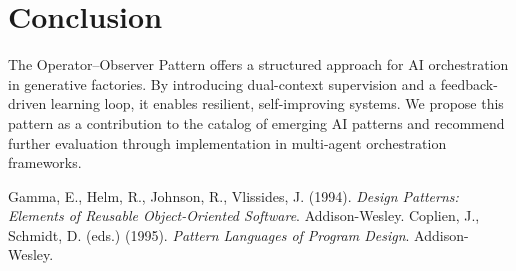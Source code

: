 \documentclass[11pt,a4paper]{article}
\begin{document}
\section{Conclusion}
The Operator--Observer Pattern offers a structured approach for AI orchestration in generative factories. By introducing dual-context supervision and a feedback-driven learning loop, it enables resilient, self-improving systems. We propose this pattern as a contribution to the catalog of emerging AI patterns and recommend further evaluation through implementation in multi-agent orchestration frameworks.


\begin{thebibliography}{9}
 Gamma, E., Helm, R., Johnson, R., Vlissides, J. (1994). \emph{Design Patterns: Elements of Reusable Object-Oriented Software}. Addison-Wesley.
 Coplien, J., Schmidt, D. (eds.) (1995). \emph{Pattern Languages of Program Design}. Addison-Wesley.
\end{thebibliography}
\end{document}
